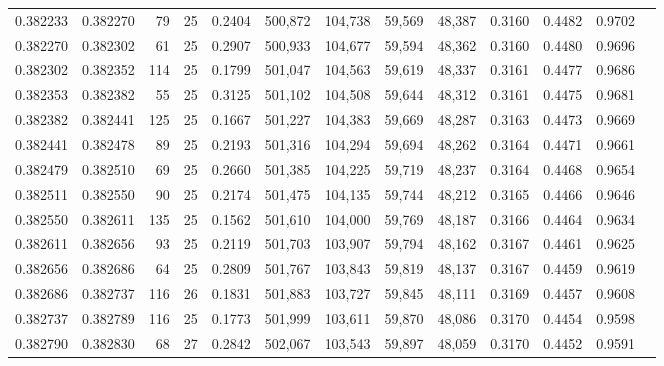 \begin{tabular}{rrrrrrrrrrrrr}
0.382233 & 0.382270 &    79 &  25 &                                     0.2404 & 500,872 & 104,738 &  59,569 &  48,387 & 0.3160 & 0.4482 & 0.9702 \\
0.382270 & 0.382302 &    61 &  25 &                                     0.2907 & 500,933 & 104,677 &  59,594 &  48,362 & 0.3160 & 0.4480 & 0.9696 \\
0.382302 & 0.382352 &   114 &  25 &                                     0.1799 & 501,047 & 104,563 &  59,619 &  48,337 & 0.3161 & 0.4477 & 0.9686 \\
0.382353 & 0.382382 &    55 &  25 &                                     0.3125 & 501,102 & 104,508 &  59,644 &  48,312 & 0.3161 & 0.4475 & 0.9681 \\
0.382382 & 0.382441 &   125 &  25 &                                     0.1667 & 501,227 & 104,383 &  59,669 &  48,287 & 0.3163 & 0.4473 & 0.9669 \\
0.382441 & 0.382478 &    89 &  25 &                                     0.2193 & 501,316 & 104,294 &  59,694 &  48,262 & 0.3164 & 0.4471 & 0.9661 \\
0.382479 & 0.382510 &    69 &  25 &                                     0.2660 & 501,385 & 104,225 &  59,719 &  48,237 & 0.3164 & 0.4468 & 0.9654 \\
0.382511 & 0.382550 &    90 &  25 &                                     0.2174 & 501,475 & 104,135 &  59,744 &  48,212 & 0.3165 & 0.4466 & 0.9646 \\
0.382550 & 0.382611 &   135 &  25 &                                     0.1562 & 501,610 & 104,000 &  59,769 &  48,187 & 0.3166 & 0.4464 & 0.9634 \\
0.382611 & 0.382656 &    93 &  25 &                                     0.2119 & 501,703 & 103,907 &  59,794 &  48,162 & 0.3167 & 0.4461 & 0.9625 \\
0.382656 & 0.382686 &    64 &  25 &                                     0.2809 & 501,767 & 103,843 &  59,819 &  48,137 & 0.3167 & 0.4459 & 0.9619 \\
0.382686 & 0.382737 &   116 &  26 &                                     0.1831 & 501,883 & 103,727 &  59,845 &  48,111 & 0.3169 & 0.4457 & 0.9608 \\
0.382737 & 0.382789 &   116 &  25 &                                     0.1773 & 501,999 & 103,611 &  59,870 &  48,086 & 0.3170 & 0.4454 & 0.9598 \\
0.382790 & 0.382830 &    68 &  27 &                                     0.2842 & 502,067 & 103,543 &  59,897 &  48,059 & 0.3170 & 0.4452 & 0.9591 \\

\end{tabular}
